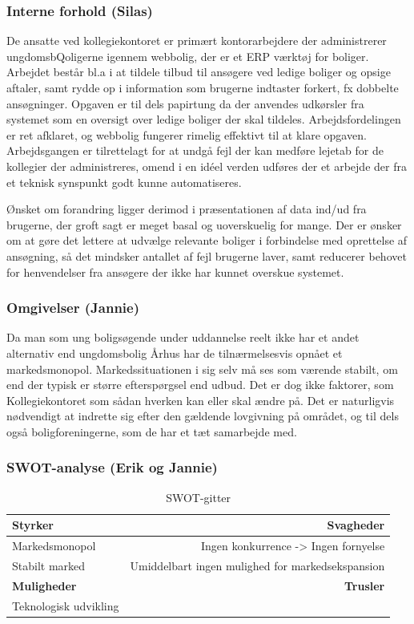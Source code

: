 \documentclass[12pt, a4paper]{report}
\begin{document}
  \subsubsection{Interne forhold (Silas)}
De ansatte ved kollegiekontoret er primært kontorarbejdere der administrerer ungdomsbQoligerne igennem webbolig, der er et ERP værktøj for boliger. Arbejdet består bl.a i at tildele tilbud til ansøgere ved ledige boliger og opsige aftaler, samt rydde op i information som brugerne indtaster forkert, fx dobbelte ansøgninger. Opgaven er til dels papirtung da der anvendes udkørsler fra systemet som en oversigt over ledige boliger der skal tildeles. Arbejdsfordelingen er ret afklaret, og webbolig fungerer rimelig effektivt til at klare opgaven. Arbejdsgangen er tilrettelagt for at undgå fejl der kan medføre lejetab for de kollegier der administreres, omend i en idéel verden udføres der et arbejde der fra et teknisk synspunkt godt kunne automatiseres.


Ønsket om forandring ligger derimod i præsentationen af data ind/ud fra brugerne, der groft sagt er meget basal og uoverskuelig for mange. Der er ønsker om at gøre det lettere at udvælge relevante boliger i forbindelse med oprettelse af ansøgning, så det mindsker antallet af fejl brugerne laver, samt reducerer behovet for henvendelser fra ansøgere der ikke har kunnet overskue systemet.

  \subsubsection{Omgivelser (Jannie)}
Da man som ung boligsøgende under uddannelse reelt ikke har et andet alternativ end ungdomsbolig Århus har de tilnærmelsesvis opnået et markedsmonopol. Markedssituationen i sig selv må ses som værende stabilt, om end der typisk er større efterspørgsel end udbud. Det er dog ikke faktorer, som Kollegiekontoret som sådan hverken kan eller skal ændre på. Det er naturligvis nødvendigt at indrette sig efter den gældende lovgivning på området, og til dels også boligforeningerne, som de har et tæt samarbejde med.

\subsubsection{SWOT-analyse (Erik og Jannie)}
\begin{table}[ht]
\caption{SWOT-gitter}
\begin{tabular}{ | l | r | }
\hline
{\bf Styrker} & {\bf Svagheder} \\ \hline
Markedsmonopol & Ingen konkurrence -> Ingen fornyelse \\
Stabilt marked & Umiddelbart ingen mulighed for markedsekspansion \\ \hline
{\bf Muligheder} & {\bf Trusler} \\ \hline
Teknologisk udvikling & \\
\hline
\end{tabular}
\end{table}
\end{document}
